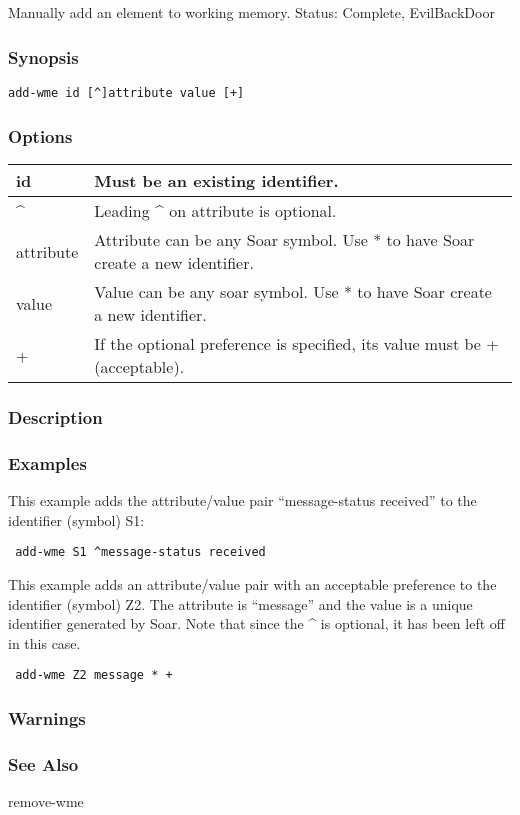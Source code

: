 \subsection{}
\label{add-wme}
Manually add an element to working memory. 
 Status: Complete, EvilBackDoor
\subsubsection*{Synopsis}
  \begin{verbatim}
add-wme id [^]attribute value [+]
\end{verbatim}
\subsubsection*{Options}
\begin{tabular}{|l|l|}
\hline 
 id  & Must be an existing identifier.  \\
 \hline 
 \^{}  & Leading \^{} on attribute is optional.  \\
 \hline 
 attribute  & Attribute can be any Soar symbol. Use * to have Soar create a new identifier.  \\
 \hline 
 value  & Value can be any soar symbol. Use * to have Soar create a new identifier.  \\
 \hline 
 +  & If the optional preference is specified, its value must be + (acceptable).  \\
 \hline 
\end{tabular}
\subsubsection*{Description}
\subsubsection*{Examples}
 This example adds the attribute/value pair ``message-status received'' to the identifier (symbol) S1: \begin{verbatim}
 add-wme S1 ^message-status received
\end{verbatim}
 This example adds an attribute/value pair with an acceptable preference to the identifier (symbol) Z2. The attribute is ``message'' and the value is a unique identifier generated by Soar. Note that since the \^{} is optional, it has been left off in this case. \begin{verbatim}
 add-wme Z2 message * + 
\end{verbatim}
\subsubsection*{Warnings}
\subsubsection*{See Also}
 remove-wme
